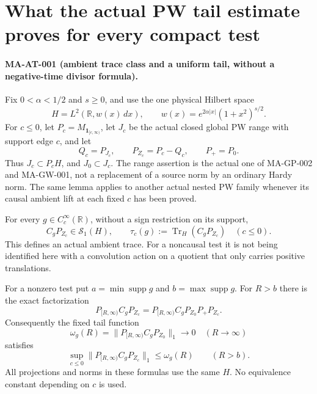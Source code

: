 \section{What the actual PW tail estimate proves for every compact test}
\label{sec:all-test-pw-tail}

\paragraph{MA-AT-001 (ambient trace class and a uniform tail, without a
negative-time divisor formula).}
Fix \(0<\alpha<1/2\) and \(s\ge0\), and use the one physical Hilbert space
\[
 H=L^2\!\left(\mathbb R,w(x)\,dx\right),\qquad
 w(x)=e^{2\alpha|x|}(1+x^2)^{s/2}.
 \tag{MA-AT.1}
\]
For \(c\le0\), let \(P_c=M_{\mathbf1_{[c,\infty)}}\), let \(J_c\) be the
actual closed global PW range with support edge \(c\), and let
\[
 Q_c=P_{J_c},\qquad P_{Z_c}=P_c-Q_c,\qquad
 P_+=P_0.
 \tag{MA-AT.2}
\]
Thus \(J_c\subset P_cH\), and \(J_0\subset J_c\).
The range assertion is the actual one of MA-GP-002 and MA-GW-001,
not a replacement of a source norm by an ordinary Hardy norm.
The same lemma applies to another actual nested PW family whenever
its causal ambient lift at each fixed \(c\) has been proved.

For every \(g\in C_c^\infty(\mathbb R)\), without a sign restriction
on its support,
\[
 C_gP_{Z_c}\in\mathcal S_1(H),\qquad
 \tau_c(g):=\operatorname{Tr}_H(C_gP_{Z_c})
 \quad(c\le0).
 \tag{MA-AT.3}
\]
This defines an actual ambient trace.  For a noncausal test it is
not being identified here with a convolution action on a quotient
that only carries positive translations.

For a nonzero test put
\(a=\min\operatorname{supp}g\) and
\(b=\max\operatorname{supp}g\).
For \(R>b\) there is the exact factorization
\[
 P_{[R,\infty)}C_gP_{Z_c}
   =P_{[R,\infty)}C_gP_{Z_0}P_+P_{Z_c}.
 \tag{MA-AT.4}
\]
Consequently the fixed tail function
\[
 \omega_g(R)=\|P_{[R,\infty)}C_gP_{Z_0}\|_1
       \longrightarrow0\quad(R\longrightarrow\infty)
 \tag{MA-AT.5}
\]
satisfies
\[
 \sup_{c\le0}\|P_{[R,\infty)}C_gP_{Z_c}\|_1
       \le\omega_g(R)\qquad(R>b).
 \tag{MA-AT.6}
\]
All projections and norms in these formulas use the same \(H\).
No equivalence constant depending on \(c\) is used.

